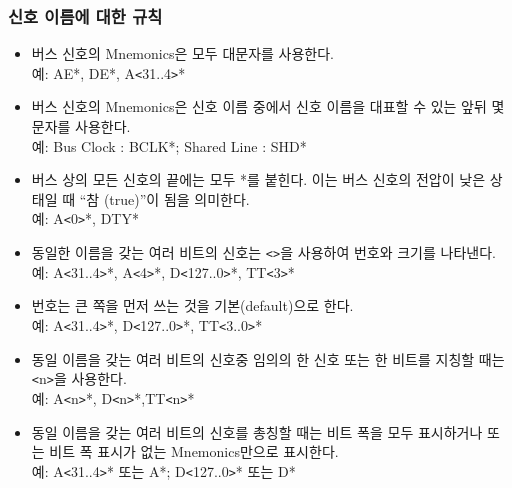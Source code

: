 \subsubsection{신호 이름에 대한 규칙}
\begin{itemize}
  \item 버스 신호의 Mnemonics은 모두 대문자를 사용한다. \\
	예: AE*, DE*, A{\tt <}31..4{\tt >}*
  \item 버스 신호의 Mnemonics은 신호 이름 중에서 신호 이름을 대표할 수 있는 앞뒤 몇 문자를 사용한다. \\
	예: Bus Clock : BCLK*; Shared Line : SHD*
  \item 버스 상의 모든 신호의 끝에는 모두 *를 붙힌다. 이는 버스 신호의 전압이 낮은 상태일 때 
	``참 (true)''이 됨을 의미한다. \\
	예: A{\tt <}0{\tt >}*, DTY*
  \item 동일한 이름을 갖는 여러 비트의 신호는 {\tt <}{\tt >}을 사용하여 번호와 크기를 나타낸다. \\
	예: A{\tt <}31..4{\tt >}*,
	A{\tt <}4{\tt >}*, D{\tt <}127..0{\tt >}*, TT{\tt <}3{\tt >}*
  \item 번호는 큰 쪽을 먼저 쓰는 것을 기본(default)으로 한다. \\
	예: A{\tt <}31..4{\tt >}*, D{\tt <}127..0{\tt >}*,
	TT{\tt <}3..0{\tt >}*
  \item 동일 이름을 갖는 여러 비트의 신호중 임의의 한 신호 또는 한 비트를 지칭할 때는 {\tt <}n{\tt >}을 사용한다. \\
	예: A{\tt <}n{\tt >}*, D{\tt <}n{\tt >}*,TT{\tt <}n{\tt >}*
  \item 동일 이름을 갖는 여러 비트의 신호를 총칭할 때는 비트 폭을 모두 표시하거나 또는 비트 폭 표시가 없는
	Mnemonics만으로 표시한다. \\
	예: A{\tt <}31..4{\tt >}* 또는 A*; D{\tt <}127..0{\tt >}* 또는 D*
\end{itemize}
%

